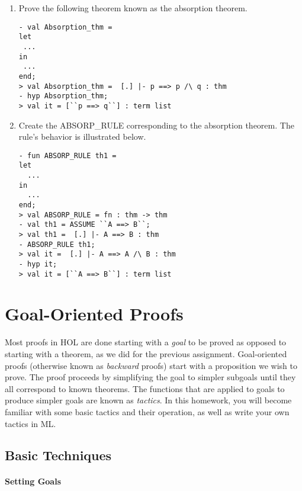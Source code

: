 \begin{exercise}
  \begin{enumerate}[{A.}]
\item Prove the following theorem known as the absorption theorem.
  \begin{small}
\begin{verbatim}
- val Absorption_thm =
let
 ...
in
 ...
end;
> val Absorption_thm =  [.] |- p ==> p /\ q : thm
- hyp Absorption_thm;
> val it = [``p ==> q``] : term list
\end{verbatim}
  \end{small}
\item Create the ABSORP\_RULE corresponding to the absorption
  theorem. The rule's behavior is illustrated below.
  \begin{small}
\begin{verbatim}
- fun ABSORP_RULE th1 =
let
  ...
in
  ...
end;
> val ABSORP_RULE = fn : thm -> thm
- val th1 = ASSUME ``A ==> B``;
> val th1 =  [.] |- A ==> B : thm
- ABSORP_RULE th1;
> val it =  [.] |- A ==> A /\ B : thm
- hyp it;
> val it = [``A ==> B``] : term list
\end{verbatim}
  \end{small}

\end{enumerate}

\end{exercise}

\section{Goal-Oriented Proofs}

Most proofs in HOL are done starting with a \emph{goal} to be proved
as opposed to starting with a theorem, as we did for the previous
assignment. Goal-oriented proofs (otherwise known as \emph{backward}
proofs) start with a proposition we wish to prove. The proof proceeds
by simplifying the goal to simpler subgoals until they all correspond
to known theorems. The functions that are applied to goals to produce
simpler goals are known as \emph{tactics}. In this homework, you will
become familiar with some basic tactics and their operation, as well
as write your own tactics in ML.

\subsection{Basic Techniques}
\label{sec:basics}

\paragraph*{Setting Goals}

